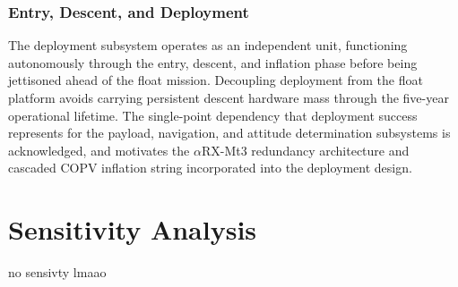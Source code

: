 \subsubsection*{Entry, Descent, and Deployment}
The deployment subsystem operates as an independent unit, functioning autonomously through the entry, descent, and inflation phase before being jettisoned ahead of the float mission. Decoupling deployment from the float platform avoids carrying persistent descent hardware mass through the five-year operational lifetime. The single-point dependency that deployment success represents for the payload, navigation, and attitude determination subsystems is acknowledged, and motivates the $\alpha$RX-Mt3 redundancy architecture and cascaded COPV inflation string incorporated into the deployment design.


\section{Sensitivity Analysis}

no sensivty lmaao





















